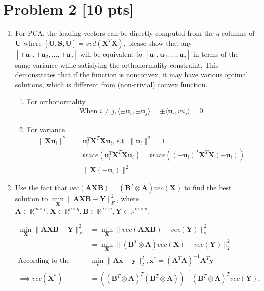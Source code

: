 \documentclass[11pt]{article}
\newcommand{\R}{\mathbb{R}}
\newcommand{\mtx}[1]{\mathbf{#1}}
\newcommand{\vct}[1]{\mathbf{#1}}
\def \mA {\mtx{A}}
\def \mB {\mtx{B}}
\def \mU {\mtx{U}}
\def \mS {\mtx{S}}
\def \mX {\mtx{X}}
\def \mY {\mtx{Y}}
\def \vu {\vct{u}}
\def \vx {\vct{x}}
\def \vy {\vct{y}}
\def \R {\mathbb{R}}
\begin{document}
\section*{Problem 2 [10 pts]}
\begin{enumerate}
	\item For PCA, the loading vectors can be directly computed from the $q$ columns of  $\mU$ where  $[\mU,\mS,\mU]=svd(\mX^T\mX)$, please show that any $[\pm\vu_1,\pm\vu_2,\dots,\pm\vu_q]$ will be equivalent to $[\vu_1,\vu_2,\dots,\vu_q]$ in terms of the same variance while satisfying the orthonormality constraint. This demonstrates that if the function is nonconvex, it may have various optimal solutions, which is different from (non-trivial) convex function.
	\begin{enumerate}
		\item For orthonormality 
		\begin{align*}
			\text{When } i\neq j, \langle\pm\vu_i,\pm\vu_j\rangle = \pm  \langle\vu_i,vu_j\rangle = 0
		\end{align*}
		\item For variance
		\begin{align*}
			\|\mX\vu_i\|^2 &= \vu_i^T\mX^T\mX\vu_i \text{, s.t. }\|\vu_i\|^2=1\\
			&=trace(\vu_i^T\mX^T\mX\vu_i) = trace((-\vu_i)^T\mX^T\mX(-\vu_i))\\
			& = \|\mX(-\vu_i)\|^2
		\end{align*}
	\end{enumerate}
	\item Use the fact that $vec(\mA\mX\mB)=(\mB^T\otimes\mA)vec(\mX)$ to find the best solution to $\min\limits_{\mX} \|\mA\mX\mB-\mY\|_F^2$, where $\mA\in\R^{m\times p}, \mX\in\R^{p\times q}, \mB\in\R^{q\times n}, \mY\in\R^{m\times n}$.

	\begin{align*}
		\min\limits_{\mX} \|\mA\mX\mB-\mY\|_F^2 &= \min\limits_{\mX} \|vec(\mA\mX\mB)-vec(\mY)\|_2^2\\
		& = \min\limits_{\mX} \|(\mB^T\otimes\mA)vec(\mX)-vec(\mY)\|_2^2\\
		\text{According to the regression model: } & \min_\vx \|\mA\vx-\vy\|^2_2, \vx^* = (\mA^T\mA)^{-1}\mA^T\vy\\
		\implies vec(\mX^*) &= ((\mB^T\otimes\mA)^T(\mB^T\otimes\mA))^{-1}(\mB^T\otimes\mA)^Tvec(\mY), 
	\end{align*}

\end{enumerate}
\newpage
\end{document}
